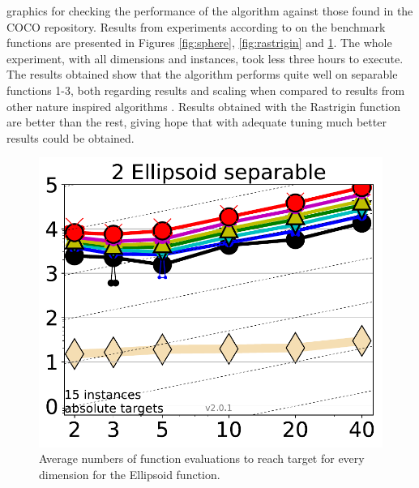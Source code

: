 graphics for checking the performance of the algorithm against
those found in the COCO repository. Results from experiments 
according to \cite{hansen2016coco} on the benchmark functions 
are presented in Figures \ref{fig:sphere}, \ref{fig:rastrigin} and \ref{fig:ellipsoid}.
The whole experiment, with all dimensions and instances, took 
less three hours to execute. %
The results obtained show that the 
algorithm performs quite well on separable functions 1-3, 
both regarding results and scaling when compared to results 
from other nature inspired algorithms \cite{hansen2010bbob}. Results
obtained with the Rastrigin function are better than the rest, giving
hope that with adequate tuning much better results could be obtained.
%
\begin{figure}[h!tbp]
    \centering
        \includegraphics[width=5in]{img/Ellipsoid.pdf}
    \caption{Average numbers of function evaluations to reach target
      for every dimension for the Ellipsoid function.}
    \label{fig:ellipsoid}
\end{figure}
%
